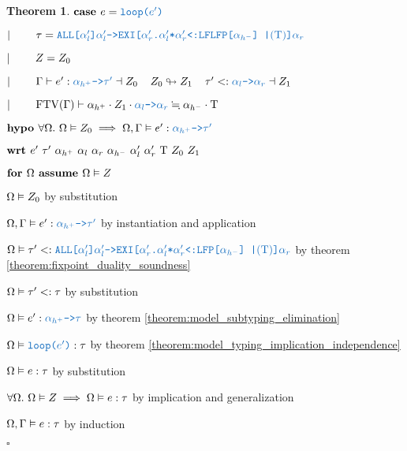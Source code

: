 \documentclass[acmsmall]{acmart}
\theoremstyle{definition}
\newtheorem{theorem}{Theorem}[section]
\begin{document}
\begin{theorem}
  \item \Z $\B{case } 
    e = \obj{loop($e'$)} 
  $ 
  \item \Z $\contin  
    \tau = \obj{ALL[$\alpha_l'$]$\alpha_l'$->EXI[$\alpha_r'$.$\alpha_l'$*$\alpha_r'$<:LFLFP[$\alpha_{h^-}$] |$(\Tau)$]$\alpha_r$} 
  $
  \item \Z $|\ \ \ \ \ \ \  
    Z = Z_0 
  $
  \item \Z $\contin  
    \Gamma \entails e' \hastype \obj{$\alpha_{h^+}$->$\tau'$} \given Z_0
    \I
    Z_0 \looparrowright Z_1
    \I
    \tau' \subtypes \obj{$\alpha_l$->$\alpha_r$} \given Z_1
  $ 
  \item \Z $\contin  
    \text{FTV}(\Gamma) \entails \alpha_{h^+} \cdot Z_1 \cdot \obj{$\alpha_l$->$\alpha_r$} \fallingdotseq \alpha_{h^-} \cdot \Tau
  $
  \item \Z $\B{hypo } 
    \forall \Omega .\ \Omega \satisfies Z_0 \implies
    \Omega, \Gamma \satisfies e' \hastype \obj{$\alpha_{h^+}$->$\tau'$}
  $ 
  \item \Z $\B{wrt } e'\ \tau'\ \alpha_{h^+}\ \alpha_l\ \alpha_r\ \alpha_{h^-}\ \alpha_l'\ \alpha_r'\ \Tau\ Z_0\ Z_1 $ 
    \item \Z\Z $\textbf{for } \Omega \textbf{ assume } \Omega \vDash Z$
      \item \Z\Z\Z $\Omega \vDash Z_0$ by substitution
      \item \Z\Z\Z $
        \Omega, \Gamma \satisfies e' \hastype \obj{$\alpha_{h^+}$->$\tau'$}
      $ by instantiation and application
      \item \Z\Z\Z $
        \Omega \satisfies \tau' \subtypes 
        \obj{ALL[$\alpha_l'$]$\alpha_l'$->EXI[$\alpha_r'$.$\alpha_l'$*$\alpha_r'$<:LFP[$\alpha_{h^-}$] |$(\Tau)$]$\alpha_r$}
      $ by theorem \ref{theorem:fixpoint_duality_soundness}

      \item \Z\Z\Z $
        \Omega \vDash \tau' <: \tau
      $ by substitution  

      \item \Z\Z\Z $
        \Omega \satisfies e' \hastype \obj{$\alpha_{h^+}$->$\tau$}
      $ by theorem \ref{theorem:model_subtyping_elimination} 

      \item \Z\Z\Z $
        \Omega \satisfies \obj{loop($e'$)} \hastype \tau 
      $ by theorem \ref{theorem:model_typing_implication_independence}

      \item \Z\Z\Z $
        \Omega \vDash e : \tau 
      $ by substitution 

    \item \Z\Z $
      \forall \Omega .\ \Omega \vDash Z \implies \Omega \vDash e : \tau 
    $ by implication and generalization 

  \item \Z $\Omega, \Gamma \vDash e : \tau$
    by induction
  \item $\square$
\end{theorem}
\end{document}
